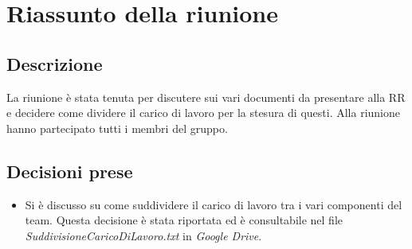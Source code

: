 \section{Riassunto della riunione}
\subsection{Descrizione}

La riunione è stata tenuta per discutere sui vari documenti da presentare alla RR e decidere come dividere il carico di lavoro per la stesura di questi. Alla riunione hanno partecipato tutti i membri del gruppo. 

\subsection{Decisioni prese}
\begin{itemize}
\item Si è discusso su come suddividere il carico di lavoro tra i vari componenti del team. Questa decisione è stata riportata ed è consultabile nel file \textit{SuddivisioneCaricoDiLavoro.txt} in \textit{Google Drive}.
\end{itemize}